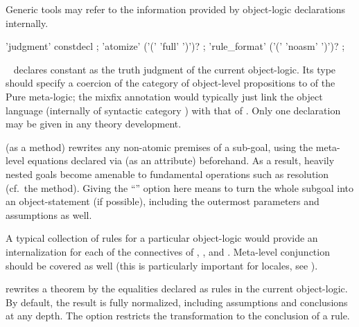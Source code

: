 \begin{isabellebody}
\begin{isamarkuptext}
  Generic tools may refer to the information provided by object-logic
  declarations internally.

  \begin{rail}
    'judgment' constdecl
    ;
    'atomize' ('(' 'full' ')')?
    ;
    'rule\_format' ('(' 'noasm' ')')?
    ;
  \end{rail}

  \begin{descr}
  
  \item [\mbox{\isa{\isacommand{judgment}}}~\isa{{\isachardoublequote}c\ {\isacharcolon}{\isacharcolon}\ {\isasymsigma}\ {\isacharparenleft}mx{\isacharparenright}{\isachardoublequote}}] declares
  constant  as the truth judgment of the current
  object-logic.  Its type \isa{{\isasymsigma}} should specify a coercion of the
  category of object-level propositions to  of the Pure
  meta-logic; the mixfix annotation  would typically
  just link the object language (internally of syntactic category
  ) with that of .  Only one \mbox{} declaration may be given in any theory development.
  
  \item [\mbox{\isa{atomize}} (as a method)] rewrites any non-atomic
  premises of a sub-goal, using the meta-level equations declared via
  \mbox{} (as an attribute) beforehand.  As a result,
  heavily nested goals become amenable to fundamental operations such
  as resolution (cf.\ the \mbox{} method).  Giving the ``'' option here means to turn the whole subgoal into an
  object-statement (if possible), including the outermost parameters
  and assumptions as well.

  A typical collection of \mbox{} rules for a particular
  object-logic would provide an internalization for each of the
  connectives of \isa{{\isachardoublequote}{\isasymAnd}{\isachardoublequote}}, \isa{{\isachardoublequote}{\isasymLongrightarrow}{\isachardoublequote}}, and \isa{{\isachardoublequote}{\isasymequiv}{\isachardoublequote}}.
  Meta-level conjunction should be covered as well (this is
  particularly important for locales, see ).

  \item [\mbox{\isa{rule{\isacharunderscore}format}}] rewrites a theorem by the
  equalities declared as \mbox{} rules in the current
  object-logic.  By default, the result is fully normalized, including
  assumptions and conclusions at any depth.  The 
  option restricts the transformation to the conclusion of a rule.


\end{descr}
\end{isamarkuptext}
\end{isabellebody}
